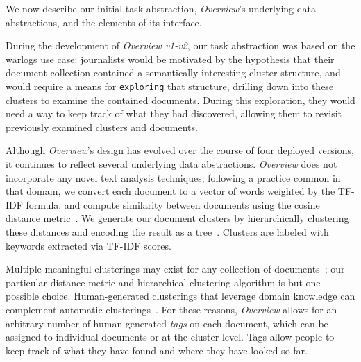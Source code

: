 We now describe our initial task abstraction, {\it Overview}'s underlying data abstractions, and the elements of its interface.

During the development of {\it Overview v1-v2}, our task abstraction was based on the {\sc warlogs} use case: journalists would be motivated by the hypothesis that their document collection contained a semantically interesting cluster structure, and would require a means for {\tt exploring} that structure, drilling down into these clusters to examine the contained documents.
During this exploration, they would need a way to keep track of what they had discovered, allowing them to revisit previously examined clusters and documents.

Although {\it Overview}'s design has evolved over the course of four deployed versions, it continues to reflect several underlying data abstractions.
{\it Overview} does not incorporate any novel text analysis techniques; following a practice common in that domain, we convert each document to a vector of words weighted by the \ac{TF-IDF} formula, and compute similarity between documents using the cosine distance metric~\cite{Salton1988}.
We generate our document clusters by hierarchically clustering these distances and encoding the result as a tree~\cite{Ingram2013,Ingram2012}.
Clusters are labeled with keywords extracted via \ac{TF-IDF} scores.

Multiple meaningful clusterings may exist for any collection of documents~\cite{Grimmer2011}; our particular distance metric and hierarchical clustering algorithm is but one possible choice.
Human-generated clusterings that leverage domain knowledge can complement automatic clusterings~\cite{Dou2013,Endert2012b}.
For these reasons, {\it Overview} allows for an arbitrary number of human-generated {\it tags} on each document, which can be assigned to individual documents or at the cluster level.
Tags allow people to keep track of what they have found and where they have looked so far.

